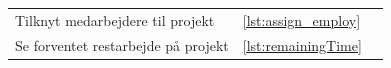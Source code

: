 \begin{table}[H]
\begin{tabular}{lll}
        Tilknyt medarbejdere til projekt                     & \cref{lst:assign_employ}                                                                                                                     &                                                                                                                                                                 \\
        Se forventet restarbejde på projekt                  & \cref{lst:remainingTime}                                                                                                                     &                                                                                                                                                                 \\
        \bottomrule
    \end{tabular}
\end{table}\newpage
